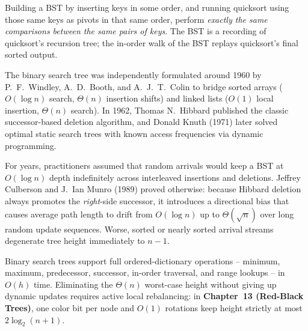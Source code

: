 \begin{center}
\end{center}

\begin{focusbox}
Building a BST by inserting keys in some order, and running quicksort using those same keys
as pivots in that same order, perform \emph{exactly the same comparisons between the same
pairs of keys}. The BST is a recording of quicksort's recursion tree; the in-order walk of the
BST replays quicksort's final sorted output.
\end{focusbox}

\begin{historybox}
The binary search tree was independently formulated around 1960 by P.~F.~Windley, A.~D.~Booth, and A.~J.~T.~Colin to bridge sorted arrays ($O(\log n)$ search, $\Theta(n)$ insertion shifts) and linked lists ($O(1)$ local insertion, $\Theta(n)$ search). In 1962, Thomas N.~Hibbard published the classic successor-based deletion algorithm, and Donald Knuth (1971) later solved optimal static search trees with known access frequencies via dynamic programming.

For years, practitioners assumed that random arrivals would keep a BST at $O(\log n)$ depth indefinitely across interleaved insertions and deletions. Jeffrey Culberson and J.~Ian Munro (1989) proved otherwise: because Hibbard deletion always promotes the \emph{right}-side successor, it introduces a directional bias that causes average path length to drift from $O(\log n)$ up to $\Theta(\sqrt{n})$ over long random update sequences. Worse, sorted or nearly sorted arrival streams degenerate tree height immediately to $n-1$.

Binary search trees support full ordered-dictionary operations -- minimum, maximum, predecessor, successor, in-order traversal, and range lookups -- in $O(h)$ time. Eliminating the $\Theta(n)$ worst-case height without giving up dynamic updates requires active local rebalancing: in \textbf{Chapter~13 (Red-Black Trees)}, one color bit per node and $O(1)$ rotations keep height strictly at most $2\log_2(n+1)$.
\end{historybox}

